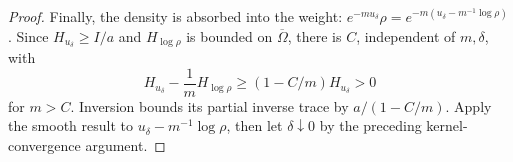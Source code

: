 \documentclass[10pt,a4paper]{amsart}
\begin{document}
\begin{proof}
Finally, the density is absorbed into the weight:
$e^{-mu_\delta}\rho=e^{-m(u_\delta-m^{-1}\log\rho)}$.
Since $H_{u_\delta}\ge I/a$ and $H_{\log\rho}$ is bounded on
$\overline\Omega$, there is $C$, independent of $m,\delta$, with
\[
H_{u_\delta}-\frac1mH_{\log\rho}
\ge(1-C/m)H_{u_\delta}>0
\]
for $m>C$.
Inversion bounds its partial inverse trace by $a/(1-C/m)$.
Apply the smooth result to $u_\delta-m^{-1}\log\rho$, then let
$\delta\downarrow0$ by the preceding kernel-convergence argument.
\end{proof}
\end{document}
